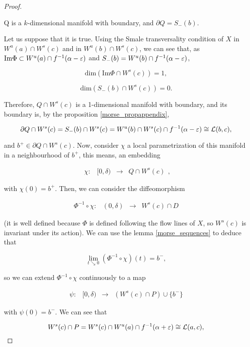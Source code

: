 \begin{proof}
\begin{prop} \label{morse_propappendix}
Q is a $k$-dimensional manifold with boundary, and $\partial Q = S_-(b)$.
\end{prop}

Let us suppose that it is true. Using the Smale transversality condition of $X$ in $W^u(a) \cap W^s(c)$ and in $W^u(b) \cap W^s(c)$, we can see that, as $\text{Im}\Phi \subset W^u(a) \cap f^{-1}(\alpha-\varepsilon)$ and $S_-(b) = W^u(b) \cap f^{-1}(\alpha-\varepsilon)$,

$$\text{dim}(\text{Im}\Phi \cap W^s(c)) = 1 ,$$

$$\text{dim}(S_-(b) \cap W^s(c)) = 0 .$$

Therefore, $Q \cap W^s(c)$ is a 1-dimensional manifold with boundary, and its boundary is, by the proposition \ref{morse_propappendix},

$$\partial Q \cap W^s(c) = S_-(b) \cap W^s(c) = W^u(b) \cap W^s(c) \cap f^{-1}(\alpha-\varepsilon) \cong \mathcal{L}(b,c) ,$$

and $b^+ \in \partial Q \cap W^s(c)$. Now, consider $\chi$ a local parametrization of this manifold in a neighbourhood of $b^+$, this means, an embedding

$$\begin{array}{rccc} \chi : & [0,\delta) & \longrightarrow & Q \cap W^s(c) \end{array} ,$$

with $\chi(0) = b^+$. Then, we can consider the diffeomorphism

$$\begin{array}{rccc} \Phi^{-1} \circ \chi : & (0,\delta) & \longrightarrow & W^s(c) \cap D \end{array}$$

(it is well defined because $\Phi$ is defined following the flow lines of $X$, so $W^s(c)$ is invariant under its action). We can use the lemma \ref{morse_sequences} to deduce that

$$\lim_{t \searrow 0} (\Phi^{-1} \circ \chi)(t) = b^- ,$$

so we can extend $\Phi^{-1} \circ \chi$ continuously to a map

$$\begin{array}{rccc} \psi : & [0,\delta) & \longrightarrow & \left( W^s(c) \cap P \right) \cup \{b^-\} \end{array}$$

with $\psi(0) = b^-$. We can see that

$$W^s(c) \cap P = W^s(c) \cap W^u(a) \cap f^{-1}(\alpha+\varepsilon) \cong \mathcal{L}(a,c) ,$$


\end{proof}
